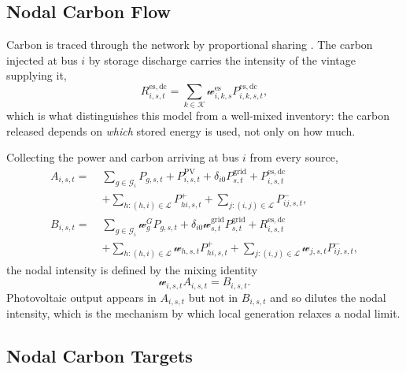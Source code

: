 \subsection{Nodal Carbon Flow}
\label{sec:nodal_carbon}

Carbon is traced through the network by proportional sharing
\cite{chen2025copf}. The carbon injected at bus $i$ by storage discharge
carries the intensity of the vintage supplying it,
\begin{equation}
R_{i,s,t}^{\mathrm{es,dc}}
=
\sum_{k\in\mathcal{K}}
\mathscr{w}_{i,k,s}^{\mathrm{es}}
P_{i,k,s,t}^{\mathrm{es,dc}},
\label{eq:storage_carbon_flow}
\end{equation}
which is what distinguishes this model from a well-mixed inventory: the
carbon released depends on \emph{which} stored energy is used, not only
on how much.

Collecting the power and carbon arriving at bus $i$ from every source,
\begin{align}
A_{i,s,t}
=\;&
\sum_{g\in\mathcal{G}_i}P_{g,s,t}
+P_{i,s,t}^{\mathrm{PV}}
+\delta_{i0}P_{s,t}^{\mathrm{grid}}
+P_{i,s,t}^{\mathrm{es,dc}}
\nonumber\\
&+\sum_{h:(h,i)\in\mathcal{L}}P_{hi,s,t}^{+}
+\sum_{j:(i,j)\in\mathcal{L}}P_{ij,s,t}^{-},
\label{eq:incoming_power}\\
B_{i,s,t}
=\;&
\sum_{g\in\mathcal{G}_i}\mathscr{w}_{g}^{G}P_{g,s,t}
+\delta_{i0}\mathscr{w}_{s,t}^{\mathrm{grid}}P_{s,t}^{\mathrm{grid}}
+R_{i,s,t}^{\mathrm{es,dc}}
\nonumber\\
&+\sum_{h:(h,i)\in\mathcal{L}}\mathscr{w}_{h,s,t}P_{hi,s,t}^{+}
+\sum_{j:(i,j)\in\mathcal{L}}\mathscr{w}_{j,s,t}P_{ij,s,t}^{-},
\label{eq:incoming_carbon}
\end{align}
the nodal intensity is defined by the mixing identity
\begin{equation}
\mathscr{w}_{i,s,t}A_{i,s,t}=B_{i,s,t}.
\label{eq:nodal_mixing}
\end{equation}
Photovoltaic output appears in $A_{i,s,t}$ but not in $B_{i,s,t}$ and so
dilutes the nodal intensity, which is the mechanism by which local
generation relaxes a nodal limit.

\subsection{Nodal Carbon Targets}
\label{sec:carbon_target}

